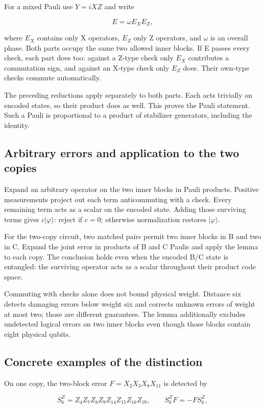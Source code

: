 \documentclass[11pt]{article}
\begin{document}
For a mixed Pauli use \(Y=iXZ\) and write

\[
E=\omega E_XE_Z,
\]

where \(E_X\) contains only X operators, \(E_Z\) only Z operators, and \(\omega\) is an overall phase. Both parts occupy the same two allowed inner blocks. If E passes every check, each part does too: against a Z-type check only \(E_X\) contributes a commutation sign, and against an X-type check only \(E_Z\) does. Their own-type checks commute automatically.

The preceding reductions apply separately to both parts. Each acts trivially on encoded states, so their product does as well. This proves the Pauli statement. Such a Pauli is proportional to a product of stabilizer generators, including the identity.

\subsection{Arbitrary errors and application to the two copies}
Expand an arbitrary operator on the two inner blocks in Pauli products. Positive measurements project out each term anticommuting with a check. Every remaining term acts as a scalar on the encoded state. Adding those surviving terms gives \(c|\varphi\rangle\): reject if \(c=0\); otherwise normalization restores \(|\varphi\rangle\).

For the two-copy circuit, two matched pairs permit two inner blocks in B and two in C. Expand the joint error in products of B and C Paulis and apply the lemma to each copy. The conclusion holds even when the encoded B/C state is entangled: the surviving operator acts as a scalar throughout their product code space.

Commuting with checks alone does not bound physical weight. Distance six detects damaging errors below weight six and corrects unknown errors of weight at most two; those are different guarantees. The lemma additionally excludes undetected logical errors on two inner blocks even though those blocks contain eight physical qubits.

\subsection{Concrete examples of the distinction}
On one copy, the two-block error \(F=X_2X_3X_8X_{11}\) is detected by

\[
S^Z_6=Z_4Z_7Z_8Z_9Z_{14}Z_{15}Z_{16}Z_{19},
\qquad S^Z_6F=-FS^Z_6,
\]
\end{document}

